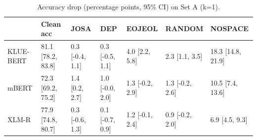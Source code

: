 \begin{table}
\caption{Accuracy drop (percentage points, 95\% CI) on Set A (k=1).}
\label{tab:table2_setA_k1}
\begin{tabular}{lllllll}
\toprule
 & Clean acc & JOSA & DEP & EOJEOL & RANDOM & NOSPACE \\
\midrule
KLUE-BERT & 81.1 [78.2, 83.8] & 0.3 [-0.4, 1.1] & 0.3 [-0.5, 1.1] & 4.0 [2.2, 5.8] & 2.3 [1.1, 3.5] & 18.3 [14.8, 21.9] \\
mBERT & 72.3 [69.2, 75.2] & 1.4 [0.2, 2.7] & 1.0 [-0.0, 2.0] & 1.3 [-0.2, 2.9] & 1.3 [-0.2, 2.6] & 10.5 [7.4, 13.6] \\
XLM-R & 77.9 [74.8, 80.7] & 0.3 [-0.6, 1.3] & 0.1 [-0.7, 0.9] & 1.2 [-0.1, 2.4] & 0.9 [-0.2, 2.0] & 6.9 [4.5, 9.3] \\
\bottomrule
\end{tabular}
\end{table}
